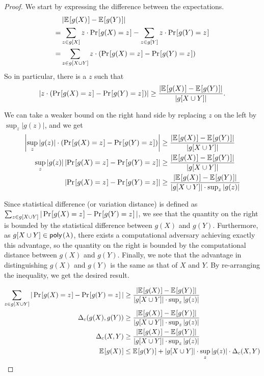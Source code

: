 \begin{proof}
	We start by expressing the difference between the expectations.
	\begin{align*}
	& \left| \expect{g(X)} - \expect{g(Y)} \right|\\
	= & \sum_{z \in g[X]} z \cdot \prob{g(X) = z} - \sum_{z \in g[Y]} z \cdot \prob{g(Y) = z} \\
	= & \sum_{z \in g[X \cup Y]} z \cdot \left(\prob{g(X) = z} - \prob{g(Y) = z} \right)
	\end{align*}
	So in particular, there is a $z$ such that
	\begin{equation*}
	\left| z \cdot (\prob{g(X) = z} - \prob{g(Y) = z}) \right| \geq \frac{\left| \expect{g(X)} - \expect{g(Y)} \right|}{|g[X \cup Y]|}.
	\end{equation*}
	
	We can take a weaker bound on the right hand side by replacing $z$ on the left by $\sup_{z} |g(z)|$, and we get
	\begin{align*}
	\left| \sup_{z} |g(z)| \cdot (\prob{g(X) = z} - \prob{g(Y) = z}) \right| & \geq \frac{\left| \expect{g(X)} - \expect{g(Y)} \right|}{|g[X \cup Y]|} \\
	\sup_{z} |g(z)| \left| \prob{g(X) = z} - \prob{g(Y) = z} \right| & \geq \frac{\left| \expect{g(X)} - \expect{g(Y)} \right|}{|g[X \cup Y]|} \\
	\left| \prob{g(X) = z} - \prob{g(Y) = z} \right| & \geq \frac{\left| \expect{g(X)} - \expect{g(Y)} \right|}{|g[X \cup Y]| \cdot \sup_{z} |g(z)|}
	\end{align*}
	
	Since statistical difference (or variation distance) is defined as $\sum_{z \in g[X \cup Y]} |\prob{g(X)=z} - \prob{g(Y)=z}|$, we see that the quantity on the right is bounded by the statistical difference between $g(X)$ and $g(Y)$. Furthermore, as $g[X \cup Y] \in \poly$, there exists a computational adversary achieving exactly this advantage, so the quantity on the right is bounded by the computational distance between $g(X)$ and $g(Y)$. Finally, we note that the advantage in distinguishing $g(X)$ and $g(Y)$ is the same as that of $X$ and $Y$. By re-arranging the inequality, we get the desired result.
	
	\begin{align*}
	\sum_{z \in g[X \cup Y]} |\prob{g(X)=z} - \prob{g(Y)=z}| & \geq \frac{\left| \expect{g(X)} - \expect{g(Y)} \right|}{|g[X \cup Y]| \cdot \sup_{z} |g(z)|} \\
	\Delta_c(g(X), g(Y)) & \geq \frac{\left| \expect{g(X)} - \expect{g(Y)} \right|}{|g[X \cup Y]| \cdot \sup_{z} |g(z)|} \\
	\Delta_c(X, Y) & \geq \frac{\left| \expect{g(X)} - \expect{g(Y)} \right|}{|g[X \cup Y]| \cdot \sup_{z} |g(z)|} \\
	\expect{g(X)} & \leq \expect{g(Y)} + |g[X \cup Y]| \cdot \sup_{z} |g(z)| \cdot \Delta_c(X,Y)
	\end{align*}
\end{proof}


